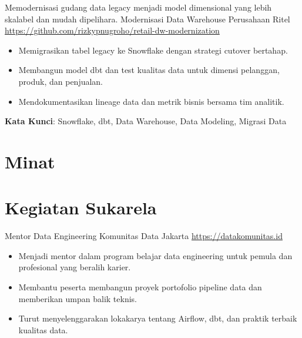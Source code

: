 \documentclass[a4paper, serif, 10pt]{moderncv}
\begin{document}
        {Memodernisasi gudang data legacy menjadi model dimensional yang lebih skalabel dan mudah dipelihara.}
        {Modernisasi Data Warehouse Perusahaan Ritel}
        {\url{https://github.com/rizkypnugroho/retail-dw-modernization}}
        {}
        {\begin{itemize}
\item Memigrasikan tabel legacy ke Snowflake dengan strategi cutover bertahap.
\item Membangun model dbt dan test kualitas data untuk dimensi pelanggan, produk, dan penjualan.
\item Mendokumentasikan lineage data dan metrik bisnis bersama tim analitik.
\end{itemize}
\textbf{Kata Kunci}: Snowflake, dbt, Data Warehouse, Data Modeling, Migrasi Data}
\section{Minat}

\section{Kegiatan Sukarela}

        {Mentor Data Engineering}
        {Komunitas Data Jakarta}
        {\url{https://datakomunitas.id}}
        {}
        {\begin{itemize}
\item Menjadi mentor dalam program belajar data engineering untuk pemula dan profesional yang beralih karier.
\item Membantu peserta membangun proyek portofolio pipeline data dan memberikan umpan balik teknis.
\item Turut menyelenggarakan lokakarya tentang Airflow, dbt, dan praktik terbaik kualitas data.
\end{itemize}}
    
\end{document}
